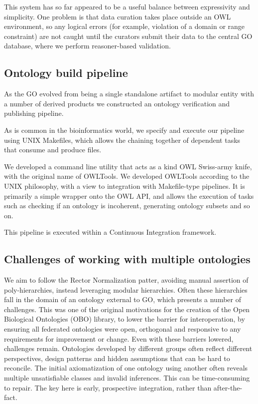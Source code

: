 \documentclass{llncs}
\begin{document}
This system has so far appeared to be a useful balance between
expressivity and simplicity. One problem is that data curation takes
place outside an OWL environment, so any logical errors (for example,
violation of a domain or range constraint) are not caught until the
curators submit their data to the central GO database, where we
perform reasoner-based validation.


\subsection{Ontology build pipeline}

As the GO evolved from being a single standalone artifact to modular
entity with a number of derived products we constructed an ontology
verification and publishing pipeline.

As is common in the bioinformatics world, we specify and execute our
pipeline using UNIX Makefiles, which allows the chaining together of
dependent tasks that consume and produce files.

We developed a command line utility that acts as a kind OWL Swiss-army
knife, with the original name of OWLTools\cite{OWLTools}. We developed
OWLTools according to the UNIX philosophy, with a view to integration
with Makefile-type pipelines. It is primarily a simple wrapper onto
the OWL API, and allows the execution of tasks such as checking if an
ontology is incoherent, generating ontology subsets and so on.

This pipeline is executed within a Continuous Integration
framework\cite{Mungall2012a}.

\subsection{Challenges of working with multiple ontologies}

We aim to follow the Rector Normalization patter, avoiding manual
assertion of poly-hierarchies, instead leveraging modular
hierarchies. Often these hierarchies fall in the domain of an ontology
external to GO, which presents a number of challenges. This was one of
the original motivations for the creation of the Open Biological
Ontologies (OBO) library, to lower the barrier for interoperation, by
ensuring all federated ontologies were open, orthogonal and responsive
to any requirements for improvement or change. Even with these
barriers lowered, challenges remain. Ontologies developed by different
groups often reflect different perspectives, design patterns and
hidden assumptions that can be hard to reconcile. The initial
axiomatization of one ontology using another often reveals multiple
unsatisfiable classes and invalid inferences. This can be
time-consuming to repair. The key here is early, prospective
integration, rather than after-the-fact.
\end{document}
